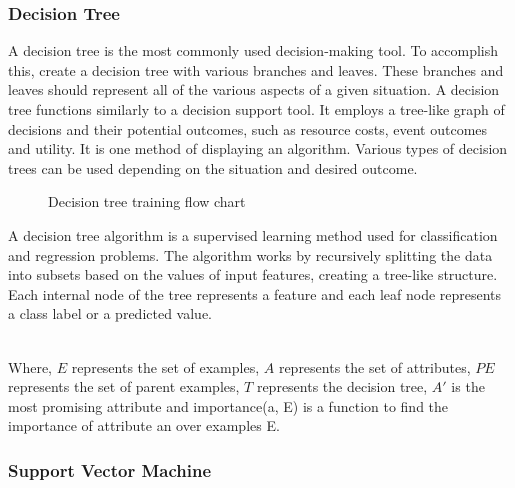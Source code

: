 \documentclass[conference]{IEEEtran}
\begin{document}
	

	\subsubsection[H]{Decision Tree}		
	A decision tree is the most commonly used decision-making tool. To accomplish this, create a decision tree with various branches and leaves. These branches and leaves should represent all of the various aspects of a given situation\cite{C28}. A decision tree functions similarly to a decision support tool. It employs a tree-like graph of decisions and their potential outcomes, such as resource costs, event outcomes and utility. It is one method of displaying an algorithm\cite{C28}. Various types of decision trees can be used depending on the situation and desired outcome.\\	
	\begin{figure}[H]
		\caption[]{Decision tree training flow chart}
		\label{Tree Diagram}
	\end{figure}
	
		A decision tree algorithm is a supervised learning method used for classification and regression problems. The algorithm works by recursively splitting the data into subsets based on the values of input features, creating a tree-like structure. Each internal node of the tree represents a feature and each leaf node represents a class label or a predicted value.
		
	\\Where, $E$ represents the set of examples, $A$ represents the set of attributes, $PE$ represents the set of parent examples, $T$ represents the decision tree, $A'$ is the most promising attribute and importance(a, E) is a function to find the importance of attribute an over examples E.\\
	
	\subsubsection{Support Vector Machine}
	
\end{document}
